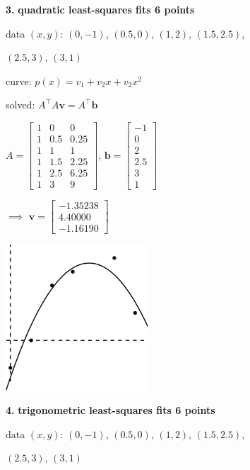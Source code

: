 \documentclass[12pt]{amsart}
\newcommand{\bb}{\mathbf{b}}
\newcommand{\bv}{\mathbf{v}}
\newcommand{\prob}[1]{\bigskip\noindent\textbf{#1.}\quad }
\newcommand{\ds}{\displaystyle}
\begin{document}
\clearpage \newpage
\prob{3} \textbf{quadratic least-squares fits 6 points}

\msni data $(x,y)$: $(0,-1)$, $(0.5,0)$, $(1,2)$, $(1.5,2.5)$,

\qquad \qquad $(2.5,3)$, $(3,1)$

\msni curve: $p(x) = v_1 + v_2 x + v_2 x^2$

\msni solved: $A^\top A \bv = A^\top \bb$

\msni $\ds A = \begin{bmatrix} 1 & 0 & 0 \\ 1 & 0.5 & 0.25 \\ 1 & 1 & 1 \\ 1 & 1.5 & 2.25 \\ 1 & 2.5 & 6.25 \\ 1 & 3 & 9 \end{bmatrix}$, \quad $\ds \bb = \begin{bmatrix} -1 \\ 0 \\ 2 \\ 2.5 \\ 3 \\ 1 \end{bmatrix}$

\msni $\implies$ \quad $\ds \bv = \begin{bmatrix} -1.35238 \\ 4.40000 \\ -1.16190 \end{bmatrix}$

\vspace{-80mm}
\hfill \includegraphics[width=0.4\textwidth]{figs/mar21fig3.pdf}

\vspace{20mm}

\prob{4} \textbf{trigonometric least-squares fits 6 points}

\msni data $(x,y)$: $(0,-1)$, $(0.5,0)$, $(1,2)$, $(1.5,2.5)$,

\qquad \qquad $(2.5,3)$, $(3,1)$
\end{document}
